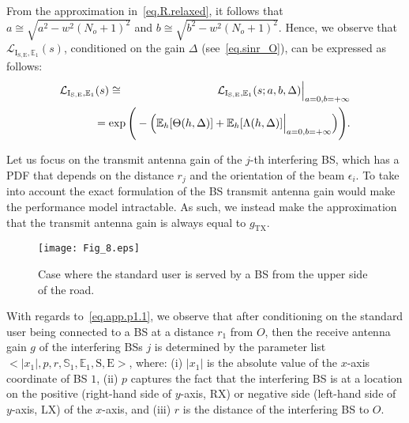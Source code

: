 \documentclass[10pt,journal,a4paper]{IEEEtran}
\begin{document}
From the approximation in~\eqref{eq.R.relaxed}, it follows that \mbox{$a \cong \sqrt{a^2-w^2(N_o+1)^2}$} and $b \cong \sqrt{b^2-w^2(N_o+1)^2}$. Hence, we observe that $\mathcal{L}_{\mathrm{I}_{\mathrm{S,E}},\mathbb{E}_1}(s)$, conditioned on the gain $\Delta$ (see~\eqref{eq.sinr_O}), can be expressed as follows:
\setlength{\arraycolsep}{0.0em} 
\begin{eqnarray}
\mathcal{L}_{\mathrm{I}_{\mathrm{S,E}},\mathbb{E}_1}(s) &{}\cong{}& \mathcal{L}_{\mathrm{I}_{\mathrm{S,E}},\mathbb{E}_1}(s;a,b,\Delta)\Big|_{a = 0, b = +\infty}\label{eq.LI}\label{eq.app.pTh1}\\
&&\hspace{-12mm}= \exp \Bigg( - \Big(\mathbb{E}_h [\Theta(h,\Delta)] + \mathbb{E}_h [\Lambda(h,\Delta)]\Big|_{a = 0, b = +\infty}\Big)\Bigg).\nonumber
\end{eqnarray}

Let us focus on the transmit antenna gain of the \mbox{$j$-th} interfering BS, which has a PDF that depends on the distance $r_j$ and the orientation of the beam $\epsilon_i$. To take into account the exact formulation of the BS transmit antenna gain would make the performance model intractable. As such, we instead make the approximation that the transmit antenna gain is always equal to $g_{\mathrm{TX}}$.

\begin{figure}[t]
\vspace{-5mm}
\centering
\texttt{[image: Fig\_8.eps]}\vspace{-3mm}
\caption{Case where the standard user is served by a BS from the upper side of the road.}\vspace{-2mm}
\label{fig.rxGainExpl}
\vspace{-4mm}
\end{figure}

With regards to~\eqref{eq.app.p1.1}, we observe that after conditioning on the standard user being connected to a BS at a distance $r_1$ from $O$, then the receive antenna gain $g$ of the interfering BSs $j$ is determined by the parameter list $<|x_1|,p,r,\mathrm{\mathbb{S}_1,\mathbb{E}_1,S,E}>$, where: (i) $|x_1|$ is the absolute value of the $x$-axis coordinate of BS $1$, (ii) $p$ captures the fact that the interfering BS is at a location on the positive (right-hand side of $y$-axis, $\mathrm{RX}$) or negative side (left-hand side of $y$-axis, $\mathrm{LX}$) of the $x$-axis, and (iii) $r$ is the distance of the interfering BS to $O$.
\end{document}
